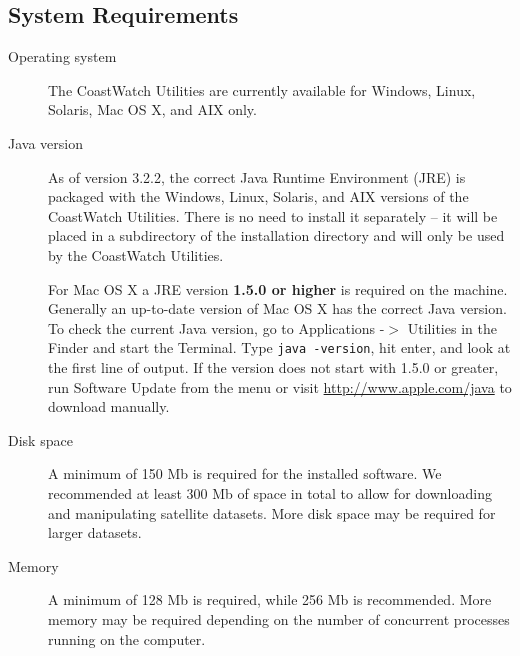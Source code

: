 {



\subsection{System Requirements}

\begin{description}

  \item[Operating system] The CoastWatch Utilities are currently
  available for Windows, Linux, Solaris, Mac OS X, and AIX only.

  \item[Java version] As of version 3.2.2, the correct Java Runtime
  Environment (JRE) is packaged with the Windows, Linux, Solaris,
  and AIX versions of the CoastWatch Utilities.  There is no need
  to install it separately -- it will be placed in a subdirectory
  of the installation directory and will only be used by the
  CoastWatch Utilities.

  For Mac OS X a JRE version {\bf 1.5.0 or higher} is required on
  the machine.  Generally an up-to-date version of Mac OS X has
  the correct Java version.  To check the current Java version,
  go to {\gui Applications} -$>$ {\gui Utilities} in the Finder and
  start the Terminal.  Type \verb+java -version+, hit enter, and
  look at the first line of output.  If the version does not
  start with 1.5.0 or greater, run {\gui Software Update} from the
   menu or visit \url{http://www.apple.com/java} to
  download manually.

  \item[Disk space] A minimum of 150 Mb is required for the installed
  software. We recommended at least 300 Mb of space in total to
  allow for downloading and manipulating satellite datasets. More
  disk space may be required for larger datasets.

  \item[Memory] A minimum of 128 Mb is required, while 256 Mb is
  recommended. More memory may be required depending on the number of
  concurrent processes running on the computer.

\end{description}

}
